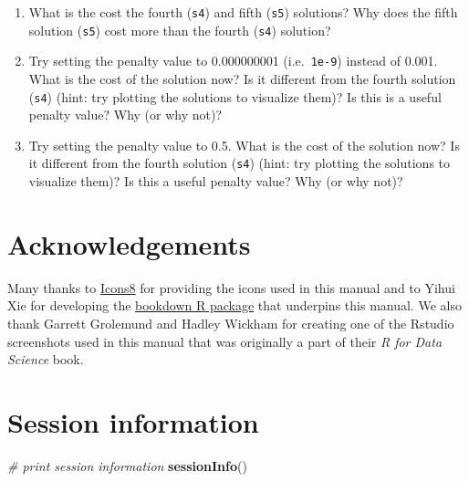 \documentclass[
  12pt,
]{book}
\makeatletter
\newenvironment{Shaded}{\begin{snugshade}}{\end{snugshade}}
\newcommand{\CommentTok}[1]{\textcolor[rgb]{0.56,0.35,0.01}{\textit{#1}}}
\newcommand{\KeywordTok}[1]{\textcolor[rgb]{0.13,0.29,0.53}{\textbf{#1}}}
\newcommand{\NormalTok}[1]{#1}
\providecommand{\tightlist}{%
  \setlength{\itemsep}{0pt}\setlength{\parskip}{0pt}}
\newenvironment{kframe}{%
\medskip{}
\setlength{\fboxsep}{.8em}
 \def\at@end@of@kframe{}%
 \ifinner\ifhmode%
  \def\at@end@of@kframe{\end{minipage}}%
  \begin{minipage}{\columnwidth}%
 \fi\fi%
 \def\FrameCommand##1{\hskip\@totalleftmargin \hskip-\fboxsep
 \colorbox{shadecolor}{##1}\hskip-\fboxsep
     \hskip-\linewidth \hskip-\@totalleftmargin \hskip\columnwidth}%
 \MakeFramed {\advance\hsize-\width
   \@totalleftmargin\z@ \linewidth\hsize
   \@setminipage}}%
 {\par\unskip\endMakeFramed%
 \at@end@of@kframe}
\newenvironment{rmdblock}[1]
  {
  \begin{itemize}
  \renewcommand{\labelitemi}{
    \raisebox{-.7\height}[0pt][0pt]{
      {\setkeys{Gin}{width=3em,keepaspectratio}\texttt{[image: images/\#1]}}
    }
  }
  \setlength{\fboxsep}{1em}
  \begin{kframe}
  \item
  }
  {
  \end{kframe}
  \end{itemize}
  }
\newenvironment{rmdquestion}
  {\begin{rmdblock}{question}}
  {\end{rmdblock}}
\makeatother
\begin{document}
\begin{rmdquestion}
\begin{enumerate}
\def\labelenumi{\arabic{enumi}.}
\tightlist
\item
  What is the cost the fourth (\texttt{s4}) and fifth (\texttt{s5}) solutions? Why does the fifth solution (\texttt{s5}) cost more than the fourth (\texttt{s4}) solution?
\item
  Try setting the penalty value to 0.000000001 (i.e.~\texttt{1e-9}) instead of 0.001. What is the cost of the solution now? Is it different from the fourth solution (\texttt{s4}) (hint: try plotting the solutions to visualize them)? Is this is a useful penalty value? Why (or why not)?
\item
  Try setting the penalty value to 0.5. What is the cost of the solution now? Is it different from the fourth solution (\texttt{s4}) (hint: try plotting the solutions to visualize them)? Is this a useful penalty value? Why (or why not)?
\end{enumerate}
\end{rmdquestion}

\hypertarget{acknowledgements}{%
\chapter{Acknowledgements}\label{acknowledgements}}

Many thanks to \href{https://icons8.com}{Icons8} for providing the icons used in this manual and to Yihui Xie for developing the \href{http://bookdown.org}{bookdown R package} that underpins this manual. We also thank Garrett Grolemund and Hadley Wickham for creating one of the Rstudio screenshots used in this manual that was originally a part of their \emph{R for Data Science} book.

\hypertarget{session-information}{%
\chapter{Session information}\label{session-information}}

\begin{Shaded}
\begin{Highlighting}[]
\CommentTok{# print session information}
\KeywordTok{sessionInfo}\NormalTok{()}
\end{Highlighting}
\end{Shaded}
\end{document}
